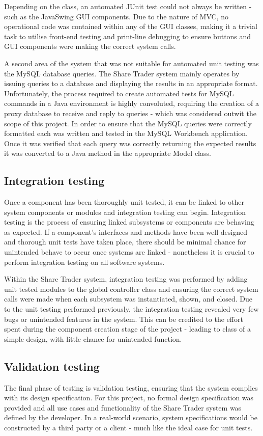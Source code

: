 \documentclass[12pt, a4paper,titlepage]{article}
\begin{document}
Depending on the class, an automated JUnit test could not always be written -
such as the JavaSwing GUI components. 
Due to the nature of MVC, no operational code was contained within any of the
GUI classes, making it a trivial task to utilise front-end testing and
print-line debugging to ensure buttons and GUI components were making the
correct system calls.

A second area of the system that was not suitable for automated unit testing
was the MySQL database queries. 
The Share Trader system mainly operates by issuing queries to a database and
displaying the results in an appropriate format. 
Unfortunately, the process required to create automated tests for
MySQL commands in a Java environment is highly convoluted, requiring the
creation of a proxy database to receive and reply to queries - which was
considered outwit the scope of this project. 
In order to ensure that the MySQL queries were correctly formatted each was
written and tested in the MySQL Workbench application. 
Once it was verified that each query was correctly returning the expected
results it was converted to a Java method in the appropriate Model class.

\subsection{Integration testing}
Once a component has been thoroughly unit tested, it can be linked to other
system components or modules and integration testing can begin. 
Integration testing is the process of ensuring linked subsystems or components
are behaving as expected.
If a component's interfaces and methods have been well designed and
thorough unit tests have taken place, there should be minimal chance for
unintended behave to occur once systems are linked - nonetheless it is crucial
to perform integration testing on all software systems.  

Within the Share Trader system, integration testing was performed by adding unit
tested modules to the global controller class and ensuring the correct system
calls were made when each subsystem was instantiated, shown, and closed.
Due to the unit testing performed previously, the integration testing revealed
very few bugs or unintended features in the system. 
This can be credited to the effort spent during the component creation stage
of the project - leading to class of a simple design, with little chance for
unintended function.

\subsection{Validation testing}
The final phase of testing is validation testing, ensuring that the system
complies with its design specification.  
For this project, no formal design specification was provided and all use
cases and functionality  of the Share Trader system was defined by the
developer.  
In a real-world scenario, system specifications would be constructed by a
third party or a client - much like the ideal case for unit tests.  
\end{document}
